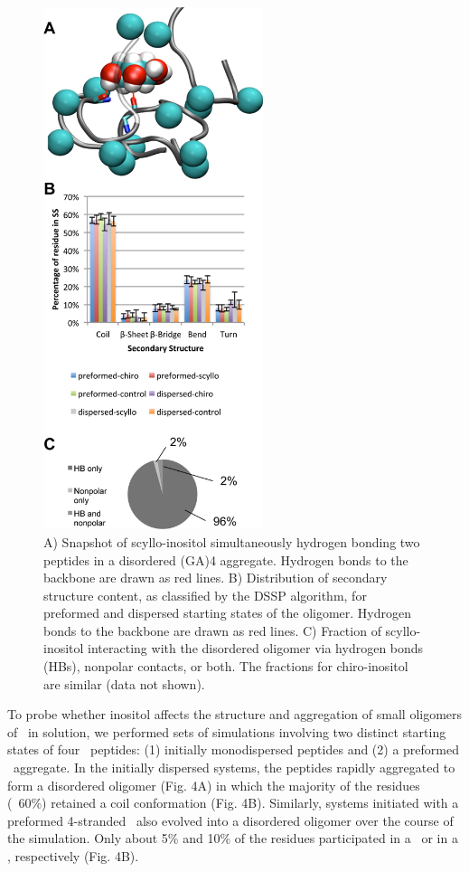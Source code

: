 \begin{figure}[ht]
  \centering
  \includegraphics[width=243px]{figures/results1/GA4_paper_figures_submitted-4}
  \caption[Binding of scyllo-inositol to the disordered oligomer of (GA)4.]{A) Snapshot of scyllo-inositol simultaneously hydrogen bonding two peptides in a disordered (GA)4 aggregate. Hydrogen bonds to the backbone are drawn as red lines. B) Distribution of secondary structure content, as classified by the DSSP algorithm, for preformed and dispersed starting states of the oligomer. Hydrogen bonds to the backbone are drawn as red lines. C) Fraction of scyllo-inositol interacting with the disordered oligomer via hydrogen bonds (HBs), nonpolar contacts, or both. The fractions for chiro-inositol are similar (data not shown).}
   \label{fig:figure4}
\end{figure}

	To probe whether inositol affects the structure and aggregation of small oligomers of \gafour\ in solution, we performed sets of simulations involving two distinct starting states of four \gafour\ peptides: (1) initially monodispersed peptides and (2) a preformed \bsheet\ aggregate. In the initially dispersed systems, the peptides rapidly aggregated to form a disordered oligomer (Fig. 4A) in which the majority of the residues (~60\%) retained a coil conformation (Fig. 4B). Similarly, systems initiated with a preformed 4-stranded \bsheet\ also evolved into a disordered oligomer over the course of the simulation. Only about 5\% and 10\% of the residues participated in a \bsheet\ or in a \bbridge, respectively (Fig. 4B).
	
